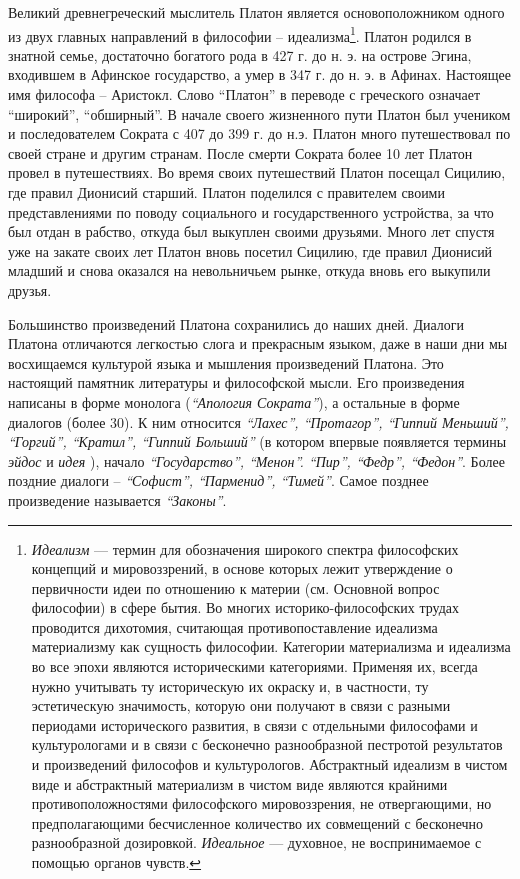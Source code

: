 \documentclass[a4paper, 14pt]{extreport}
\begin{document}
Великий древнегреческий мыслитель Платон является основоположником
одного из двух главных направлений в философии -- идеализма\footnote{
  \emph{Идеализм} ---
  термин для обозначения широкого спектра философских концепций и
  мировоззрений, в основе которых лежит утверждение о первичности идеи
  по отношению к материи (см. Основной вопрос философии) в сфере бытия.
  Во многих историко-философских трудах проводится дихотомия, считающая
  противопоставление идеализма материализму как сущность философии.
  Категории материализма и идеализма во все эпохи являются историческими
  категориями. Применяя их, всегда нужно учитывать ту историческую их
  окраску и, в частности, ту эстетическую значимость, которую они
  получают в связи с разными периодами исторического развития, в связи с
  отдельными философами и культурологами и в связи с бесконечно
  разнообразной пестротой результатов и произведений философов и
  культурологов. Абстрактный идеализм в чистом виде и абстрактный
  материализм в чистом виде являются крайними противоположностями
  философского мировоззрения, не отвергающими, но предполагающими
  бесчисленное количество их совмещений с бесконечно разнообразной
  дозировкой. \emph{Идеальное} --- духовное, не воспринимаемое с помощью
  органов чувств.
  }. Платон родился в знатной семье, достаточно
богатого рода в 427 г. до н. э. на острове Эгина, входившем в Афинское
государство, а умер в 347 г. до н. э. в Афинах. Настоящее имя философа
-- Аристокл. Слово ``Платон'' в переводе с греческого означает
``широкий'', ``обширный''. В начале своего жизненного пути Платон был
учеником и последователем Сократа с 407 до 399 г. до н.э. Платон много
путешествовал по своей стране и другим странам. После смерти Сократа
более 10 лет Платон провел в путешествиях. Во время своих путешествий
Платон посещал Сицилию, где правил Дионисий старший. Платон поделился с
правителем своими представлениями по поводу социального и
государственного устройства, за что был отдан в рабство, откуда был
выкуплен своими друзьями. Много лет спустя уже на закате своих лет
Платон вновь посетил Сицилию, где правил Дионисий младший и снова
оказался на невольничьем рынке, откуда вновь его выкупили друзья.

Большинство произведений Платона сохранились до наших дней. Диалоги
Платона отличаются легкостью слога и прекрасным языком, даже в наши дни
мы восхищаемся культурой языка и мышления произведений Платона. Это
настоящий памятник литературы и философской мысли. Его произведения
написаны в форме монолога (\emph{``Апология Сократа''}), а остальные в
форме диалогов (более 30). К ним относится \emph{``Лахес'',
``Протагор'', ``Гиппий Меньший'', ``Горгий'', ``Кратил'', ``Гиппий
Больший''} (в котором впервые появляется термины \emph{эйдос} и
\emph{идея} ), начало \emph{``Государство'', ``Менон''. ``Пир'',
``Федр'', ``Федон''}. Более поздние диалоги -- \emph{``Софист'',
``Парменид'', ``Тимей''}. Самое позднее произведение называется
\emph{``Законы''}.
\end{document}
